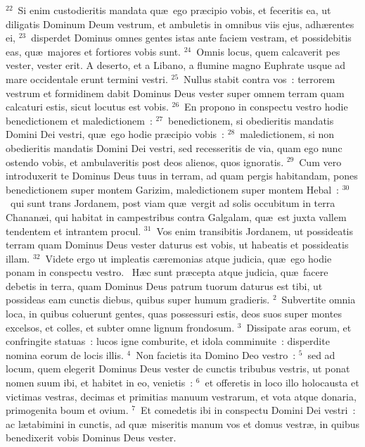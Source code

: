 ${}^{22}$~Si enim custodieritis mandata qu\ae\ ego pr\ae cipio vobis, et feceritis ea, ut diligatis Dominum Deum vestrum, et ambuletis in omnibus viis ejus, adh\ae rentes ei,
${}^{23}$~disperdet Dominus omnes gentes istas ante faciem vestram, et possidebitis eas, qu\ae\ majores et fortiores vobis sunt.
${}^{24}$~Omnis locus, quem calcaverit pes vester, vester erit. A deserto, et a Libano, a flumine magno Euphrate usque ad mare occidentale erunt termini vestri.
${}^{25}$~Nullus stabit contra vos~: terrorem vestrum et formidinem dabit Dominus Deus vester super omnem terram quam calcaturi estis, sicut locutus est vobis.
${}^{26}$~En propono in conspectu vestro hodie benedictionem et maledictionem~:
${}^{27}$~benedictionem, si obedieritis mandatis Domini Dei vestri, qu\ae\ ego hodie pr\ae cipio vobis~:
${}^{28}$~maledictionem, si non obedieritis mandatis Domini Dei vestri, sed recesseritis de via, quam ego nunc ostendo vobis, et ambulaveritis post deos alienos, quos ignoratis.
${}^{29}$~Cum vero introduxerit te Dominus Deus tuus in terram, ad quam pergis habitandam, pones benedictionem super montem Garizim, maledictionem super montem Hebal~:
${}^{30}$~qui sunt trans Jordanem, post viam qu\ae\ vergit ad solis occubitum in terra Chanan\ae i, qui habitat in campestribus contra Galgalam, qu\ae\ est juxta vallem tendentem et intrantem procul.
${}^{31}$~Vos enim transibitis Jordanem, ut possideatis terram quam Dominus Deus vester daturus est vobis, ut habeatis et possideatis illam.
${}^{32}$~Videte ergo ut impleatis c\ae remonias atque judicia, qu\ae\ ego hodie ponam in conspectu vestro.
~H\ae c sunt pr\ae cepta atque judicia, qu\ae\ facere debetis in terra, quam Dominus Deus patrum tuorum daturus est tibi, ut possideas eam cunctis diebus, quibus super humum gradieris.
${}^{2}$~Subvertite omnia loca, in quibus coluerunt gentes, quas possessuri estis, deos suos super montes excelsos, et colles, et subter omne lignum frondosum.
${}^{3}$~Dissipate aras eorum, et confringite statuas~: lucos igne comburite, et idola comminuite~: disperdite nomina eorum de locis illis.
${}^{4}$~Non facietis ita Domino Deo vestro~:
${}^{5}$~sed ad locum, quem elegerit Dominus Deus vester de cunctis tribubus vestris, ut ponat nomen suum ibi, et habitet in eo, venietis~:
${}^{6}$~et offeretis in loco illo holocausta et victimas vestras, decimas et primitias manuum vestrarum, et vota atque donaria, primogenita boum et ovium.
${}^{7}$~Et comedetis ibi in conspectu Domini Dei vestri~: ac l\ae tabimini in cunctis, ad qu\ae\ miseritis manum vos et domus vestr\ae , in quibus benedixerit vobis Dominus Deus vester.
